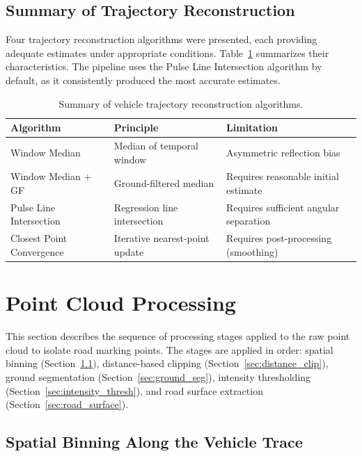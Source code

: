 \FloatBarrier
\subsection{Summary of Trajectory Reconstruction}
\label{sec:trace_summary}

Four trajectory reconstruction algorithms were presented, each providing adequate estimates under appropriate conditions. Table~\ref{tab:trace_algorithms} summarizes their characteristics. The pipeline uses the Pulse Line Intersection algorithm by default, as it consistently produced the most accurate estimates.

\begin{table}[htbp]
  \centering
  \caption{Summary of vehicle trajectory reconstruction algorithms.}
  \label{tab:trace_algorithms}
  \small
  \begin{tabular}{@{}lp{}p{}@{}}
    \hline
    Algorithm & Principle & Limitation \\
    \hline
    Window Median & Median of temporal window & Asymmetric reflection bias \\
    Window Median + GF & Ground-filtered median & Requires reasonable initial estimate \\
    Pulse Line Intersection & Regression line intersection & Requires sufficient angular separation \\
    Closest Point Convergence & Iterative nearest-point update & Requires post-processing (smoothing) \\
    \hline
  \end{tabular}
\end{table}

\FloatBarrier
\section{Point Cloud Processing}
\label{sec:pointcloud_processing}

This section describes the sequence of processing stages applied to the raw point cloud to isolate road marking points. The stages are applied in order: spatial binning (Section~\ref{sec:binning}), distance-based clipping (Section~\ref{sec:distance_clip}), ground segmentation (Section~\ref{sec:ground_seg}), intensity thresholding (Section~\ref{sec:intensity_thresh}), and road surface extraction (Section~\ref{sec:road_surface}).

\FloatBarrier
\subsection{Spatial Binning Along the Vehicle Trace}
\label{sec:binning}

